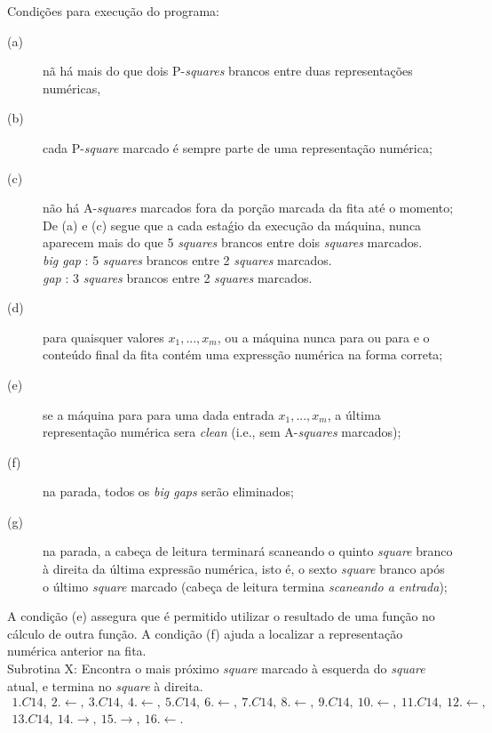 \documentclass[10pt,letterpaper]{article}
\begin{document}
Condi\c{c}\~{o}es para execu\c{c}\~{a}o do programa:
\begin{description}
\item[(a)] n\~{a} h\'a mais do que dois P-\textit{squares} brancos entre duas representa\c{c}\~{o}es num\'ericas,
\item[(b)] cada P-\textit{square} marcado \'e sempre parte de uma representa\c{c}\~{a}o num\'erica;
\item[(c)] n\~{a}o h\'a A-\textit{squares} marcados fora da por\c{c}\~{a}o marcada da fita at\'e o momento;\\
De (a) e (c) segue que a cada esta\'gio da execu\c{c}\~{a}o da m\'aquina, nunca aparecem mais do que 5 \textit{squares} brancos entre dois \textit{squares} marcados.\\
\textit{big gap} : 5 \textit{squares} brancos entre 2 \textit{squares} marcados.\\
\textit{gap} : 3 \textit{squares} brancos entre 2 \textit{squares} marcados.
\item[(d)] para quaisquer valores $x_1, ... , x_m$, ou a m\'aquina nunca para ou para e o conte\'udo final da fita cont\'em uma express\c{c}\~{a}o num\'erica na forma correta;
\item[(e)] se a m\'aquina para para uma dada entrada $x_1, ... , x_m$, a \'ultima representa\c{c}\~{a}o num\'erica sera \textit{clean} (i.e., sem A-\textit{squares} marcados);
\item[(f)] na parada, todos os \textit{big gaps} ser\~{a}o eliminados;
\item[(g)] na parada, a cabe\c{c}a de leitura terminar\'a scaneando o quinto \textit{square} branco \`a direita da \'ultima express\~{a}o num\'erica, isto \'e, o sexto \textit{square} branco ap\'os o \'ultimo \textit{square} marcado (cabe\c{c}a de leitura termina \textit{scaneando a entrada});
\end{description}
A condi\c{c}\~{a}o (e) assegura que \'e permitido utilizar o resultado de uma fun\c{c}\~{a}o no c\'alculo de outra fun\c{c}\~{a}o. A condi\c{c}\~{a}o (f) ajuda a localizar a representa\c{c}\~{a}o num\'erica anterior na fita.\\

Subrotina X: Encontra o mais pr\'oximo \textit{square} marcado \`a esquerda do \textit{square} atual, e termina no \textit{square} \`a direita.
\begin{multline*}
1.C14,\ 2.\leftarrow,\ 3.C14,\ 4.\leftarrow,\ 5.C14,\ 6.\leftarrow,\ 7.C14,\ 8.\leftarrow,\ 9.C14,\ 10.\leftarrow,\ 11.C14,\ 12.\leftarrow,\nonumber\\ 13.C14,\ 14.\rightarrow,\ 15.\rightarrow,\ 16.\leftarrow.
\end{multline*}
\end{document}
